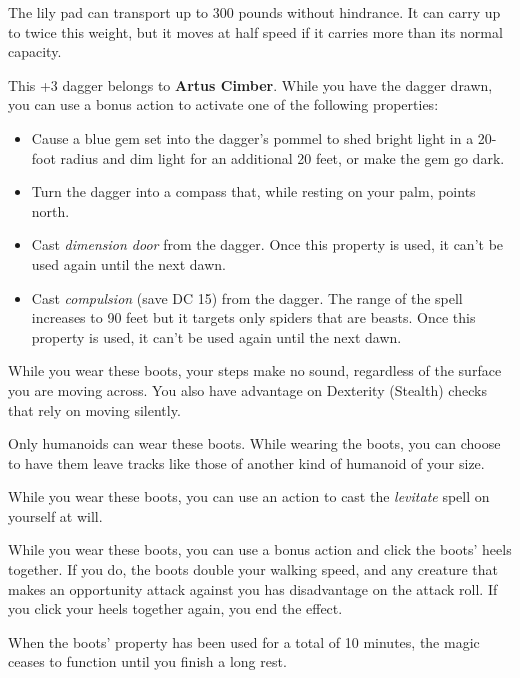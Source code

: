 \documentclass[10pt,a4paper,twoside,bg=print,twocolumn,openany,nodeprecatedcode]{dndbook}
\begin{document}
The lily pad can transport up to 300 pounds without hindrance. It can carry up to twice this weight, but it moves at half speed if it carries more than its normal capacity.

This +3 dagger belongs to \textbf{Artus Cimber}. While you have the dagger drawn, you can use a bonus action to activate one of the following properties:


\begin{itemize}
\item Cause a blue gem set into the dagger's pommel to shed bright light in a 20-foot radius and dim light for an additional 20 feet, or make the gem go dark.
\item Turn the dagger into a compass that, while resting on your palm, points north.
\item Cast \textit{dimension door} from the dagger. Once this property is used, it can't be used again until the next dawn.
\item Cast \textit{compulsion} (save DC 15) from the dagger. The range of the spell increases to 90 feet but it targets only spiders that are beasts. Once this property is used, it can't be used again until the next dawn.
\end{itemize}

While you wear these boots, your steps make no sound, regardless of the surface you are moving across. You also have advantage on Dexterity (Stealth) checks that rely on moving silently.

Only humanoids can wear these boots. While wearing the boots, you can choose to have them leave tracks like those of another kind of humanoid of your size.

While you wear these boots, you can use an action to cast the \textit{levitate} spell on yourself at will.

While you wear these boots, you can use a bonus action and click the boots' heels together. If you do, the boots double your walking speed, and any creature that makes an opportunity attack against you has disadvantage on the attack roll. If you click your heels together again, you end the effect.

When the boots' property has been used for a total of 10 minutes, the magic ceases to function until you finish a long rest.
\end{document}
